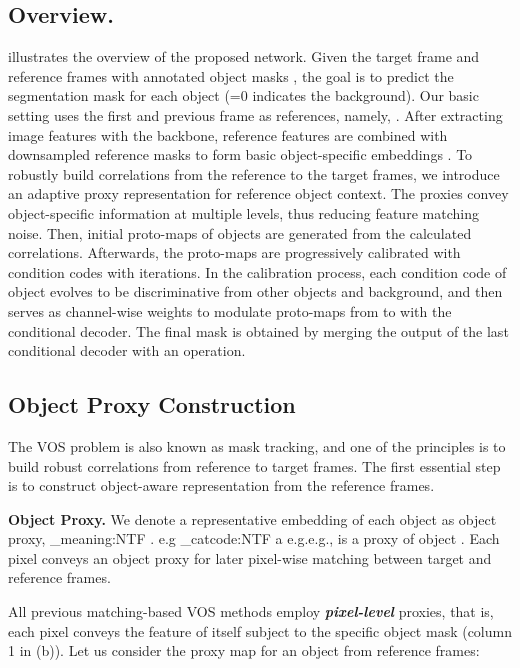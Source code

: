 \documentclass[sigconf]{acmart}
\makeatletter
\newcommand\latinabbrev[1]{
	\peek_meaning:NTF . {#1\@}{ \peek_catcode:NTF a {#1.\@ }{#1.\@}}}
\def\eg{\latinabbrev{e.g}}
\makeatother
\begin{document}
\subsection{Overview.}
\label{sec:method/overview}
\fig{\ref{fig:PIPELINE}} illustrates the overview of the proposed network.
Given the target frame  and reference frames  with annotated object masks , the goal is to predict the segmentation mask for each object  (=0 indicates the background). Our basic setting uses the first and previous frame as references, namely, .
After extracting image features with the backbone, reference features are combined with downsampled reference masks to form basic object-specific embeddings . To robustly build correlations from the reference to the target frames, we introduce an adaptive proxy representation for reference object context. The proxies convey object-specific information at multiple levels, thus reducing feature matching noise. Then, initial proto-maps  of objects are generated from the calculated correlations. Afterwards, the proto-maps are progressively calibrated with condition codes  with  iterations. In the calibration process, each condition code  of object  evolves to be discriminative from other objects and background, and then serves as channel-wise weights to modulate proto-maps from  to  with the conditional decoder. 
The final mask  is obtained by merging the output of the last conditional decoder with an {} operation.


\subsection{Object Proxy Construction}
\label{sec:method/metric_learning}
The VOS problem is also known as mask tracking, and one of the principles is to build robust correlations from reference to target frames. The first essential step is to construct object-aware representation from the reference frames.

\noindent
\textbf{Object Proxy.}
We denote a representative embedding of each object as object proxy, \eg,  is a proxy of object . Each pixel conveys an object proxy for later pixel-wise matching between target and reference frames.

All previous matching-based VOS methods \cite{voigtlaender2019feelvos,yang2020collaborative,oh2019video,seong2020kernelized,lu2020video,cheng2021modular,liang2020video,hu2018videomatch,duke2021sstvos,mao2021joint} employ \textbf{\textit{pixel-level}} proxies, that is, each pixel conveys the feature of itself subject to the specific object mask (column 1 in \fig{\ref{fig:object_representation}} (b)). Let us consider the proxy map  for an object  from reference frames:
\end{document}
